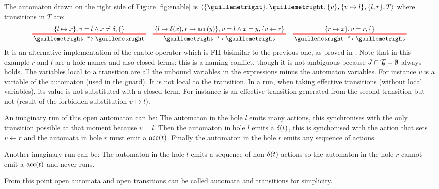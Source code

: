 \documentclass{article}
\begin{document}
\begin{exi}
The automaton drawn on the right side of Figure \ref{fig:enable} is \(\OA{\mbrc{»}}{»}{\mbrc{v}}{\mbrc{v \mapsto l}}{\mbrc{l, r}}{T}\) where transitions in \(T\) are:
\begin{align*}
	\OT{»}{»}{x}{\mbrc{l \mapsto x}}{v = l \wedge x \neq \delta}{\mbrc{}} &&
	\OT{»}{»}{\tau}{\mbrc{l \mapsto \delta\mpar{x}, r \mapsto \act{acc}\mpar{y}}}{v = l \wedge x = y}{\mbrc{v \gets r}} &&
	\OT{»}{»}{x}{\mbrc{r \mapsto x}}{v = r}{\mbrc{}}
\end{align*}
It is an alternative implementation of the enable operator which is FH-bisimilar to the previous one, as proved in .
Note that in this example \(r\) and \(l\) are a hole names and also closed terms: this is a naming conflict, though it is not ambiguous because \(J \cap {\mathcal{T}}_{\!\!\emptyset} = \emptyset\) always holds.
The variables local to a transition are all the unbound variables in the expressions minus the automaton variables.
For instance \(v\) is a variable of the automaton (used in the guard).
It is not local to the transition.
In a run, when taking effective transitions (without local variables), its value is not substituted with a closed term.
For instance  is an effective transition generated from the second transition but not  (result of the forbidden substitution \(v \mapsto l\)).

An imaginary run of this open automaton can be: The automaton in the hole \(l\) emits many actions, this synchronises with the only transition possible at that moment because \(v = l\).
Then the automaton in hole \(l\) emits a \(\delta{\left(t\right)}\), this is synchonised with the action that sets \(v \gets r\) and the automata in hole \(r\) must emit a \(\mathrm{acc}{\left(t\right)}\).
Finally the automaton in the hole \(r\) emits any sequence of actions.

Another imaginary run can be: The automaton in the hole \(l\) emits a sequence of non \(\delta{\left(t\right)}\) actions so the automaton in the hole \(r\) cannot emit a \(\mathrm{acc}{\left(t\right)}\) and never runs.
\end{exi}

From this point open automata and open transitions can be called automata and transitions for simplicity. %
\end{document}
